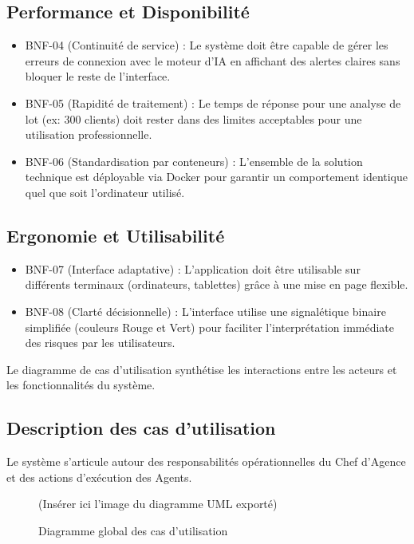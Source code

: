 \subsection{Performance et Disponibilité}
\begin{itemize}
    \item BNF-04 (Continuité de service) : Le système doit être capable de gérer les erreurs de connexion avec le moteur d'IA en affichant des alertes claires sans bloquer le reste de l'interface.
    \item BNF-05 (Rapidité de traitement) : Le temps de réponse pour une analyse de lot (ex: 300 clients) doit rester dans des limites acceptables pour une utilisation professionnelle.
    \item BNF-06 (Standardisation par conteneurs) : L'ensemble de la solution technique est déployable via Docker pour garantir un comportement identique quel que soit l'ordinateur utilisé.
\end{itemize}

\subsection{Ergonomie et Utilisabilité}
\begin{itemize}
    \item BNF-07 (Interface adaptative) : L'application doit être utilisable sur différents terminaux (ordinateurs, tablettes) grâce à une mise en page flexible.
    \item BNF-08 (Clarté décisionnelle) : L'interface utilise une signalétique binaire simplifiée (couleurs Rouge et Vert) pour faciliter l'interprétation immédiate des risques par les utilisateurs.
\end{itemize}


Le diagramme de cas d'utilisation synthétise les interactions entre les acteurs et les fonctionnalités du système. 

\subsection{Description des cas d'utilisation}

Le système s'articule autour des responsabilités opérationnelles du Chef d'Agence et des actions d'exécution des Agents.

\begin{figure}[H]
    \centering
    (Insérer ici l'image du diagramme UML exporté)
    \caption{Diagramme global des cas d'utilisation}
    \label{fig:use_case}
\end{figure}

